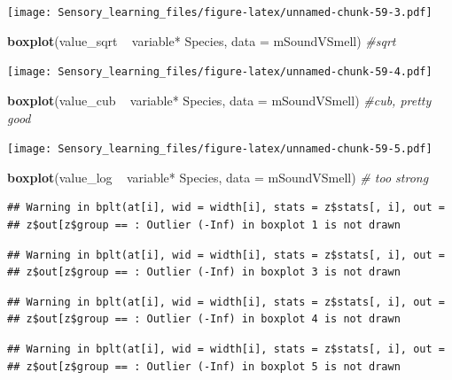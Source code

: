 \documentclass[]{article}
\newenvironment{Shaded}{\begin{snugshade}}{\end{snugshade}}
\newcommand{\KeywordTok}[1]{\textcolor[rgb]{0.13,0.29,0.53}{\textbf{{#1}}}}
\newcommand{\DataTypeTok}[1]{\textcolor[rgb]{0.13,0.29,0.53}{{#1}}}
\newcommand{\StringTok}[1]{\textcolor[rgb]{0.31,0.60,0.02}{{#1}}}
\newcommand{\CommentTok}[1]{\textcolor[rgb]{0.56,0.35,0.01}{\textit{{#1}}}}
\newcommand{\NormalTok}[1]{{#1}}
\begin{document}
\texttt{[image: Sensory\_learning\_files/figure-latex/unnamed-chunk-59-3.pdf]}

\begin{Shaded}
\begin{Highlighting}[]
\KeywordTok{boxplot}\NormalTok{(value_sqrt ~}\StringTok{  }\NormalTok{variable*}\StringTok{ }\NormalTok{Species, }\DataTypeTok{data =} \NormalTok{mSoundVSmell) }\CommentTok{#sqrt}
\end{Highlighting}
\end{Shaded}

\texttt{[image: Sensory\_learning\_files/figure-latex/unnamed-chunk-59-4.pdf]}

\begin{Shaded}
\begin{Highlighting}[]
\KeywordTok{boxplot}\NormalTok{(value_cub ~}\StringTok{  }\NormalTok{variable*}\StringTok{ }\NormalTok{Species, }\DataTypeTok{data =} \NormalTok{mSoundVSmell) }\CommentTok{#cub, pretty good}
\end{Highlighting}
\end{Shaded}

\texttt{[image: Sensory\_learning\_files/figure-latex/unnamed-chunk-59-5.pdf]}

\begin{Shaded}
\begin{Highlighting}[]
\KeywordTok{boxplot}\NormalTok{(value_log ~}\StringTok{  }\NormalTok{variable*}\StringTok{ }\NormalTok{Species, }\DataTypeTok{data =} \NormalTok{mSoundVSmell) }\CommentTok{# too strong}
\end{Highlighting}
\end{Shaded}

\begin{verbatim}
## Warning in bplt(at[i], wid = width[i], stats = z$stats[, i], out =
## z$out[z$group == : Outlier (-Inf) in boxplot 1 is not drawn
\end{verbatim}

\begin{verbatim}
## Warning in bplt(at[i], wid = width[i], stats = z$stats[, i], out =
## z$out[z$group == : Outlier (-Inf) in boxplot 3 is not drawn
\end{verbatim}

\begin{verbatim}
## Warning in bplt(at[i], wid = width[i], stats = z$stats[, i], out =
## z$out[z$group == : Outlier (-Inf) in boxplot 4 is not drawn
\end{verbatim}

\begin{verbatim}
## Warning in bplt(at[i], wid = width[i], stats = z$stats[, i], out =
## z$out[z$group == : Outlier (-Inf) in boxplot 5 is not drawn
\end{verbatim}
\end{document}
